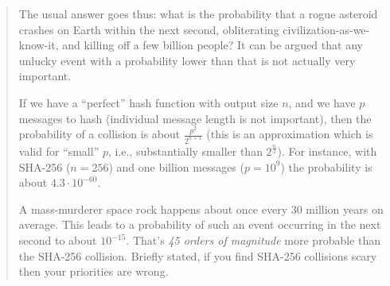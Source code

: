 \documentclass[a4paper]{scrartcl}
\begin{document}
\begin{quote}
The usual answer goes thus: what is the probability that a rogue asteroid
crashes on Earth within the next second, obliterating
civilization-as-we-know-it, and killing off a few billion people? It can be
argued that any unlucky event with a probability lower than that is not
actually very important.

If we have a ``perfect'' hash function with output size $n$, and we have $p$
messages to hash (individual message length is not important), then the
probability of a collision is about $\frac{p^2}{2^{n+1}}$ (this is an
approximation which is valid for ``small'' $p$, i.e., substantially smaller
than $2^{\frac{n}{2}}$). For instance, with SHA-256 ($n=256$) and one billion
messages ($p=10^9$) the probability is about $4.3 \cdot 10^{-60}$.

A mass-murderer space rock happens about once every 30 million years on
average. This leads to a probability of such an event occurring in the next
second to about $10^{-15}$. That's \emph{45 orders of magnitude} more probable
than the SHA-256 collision. Briefly stated, if you find SHA-256 collisions
scary then your priorities are wrong.
\end{quote}
\end{document}
